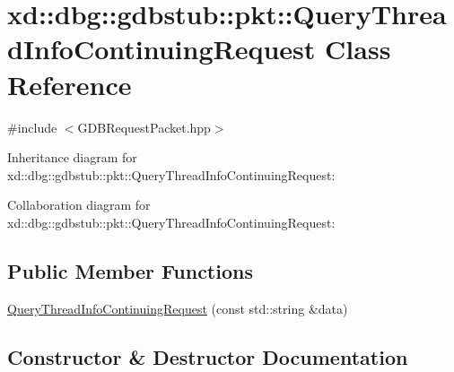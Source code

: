 \hypertarget{classxd_1_1dbg_1_1gdbstub_1_1pkt_1_1_query_thread_info_continuing_request}{}\section{xd\+:\+:dbg\+:\+:gdbstub\+:\+:pkt\+:\+:Query\+Thread\+Info\+Continuing\+Request Class Reference}
\label{classxd_1_1dbg_1_1gdbstub_1_1pkt_1_1_query_thread_info_continuing_request}


{\ttfamily \#include $<$G\+D\+B\+Request\+Packet.\+hpp$>$}



Inheritance diagram for xd\+:\+:dbg\+:\+:gdbstub\+:\+:pkt\+:\+:Query\+Thread\+Info\+Continuing\+Request\+:


Collaboration diagram for xd\+:\+:dbg\+:\+:gdbstub\+:\+:pkt\+:\+:Query\+Thread\+Info\+Continuing\+Request\+:
\subsection*{Public Member Functions}
\begin{DoxyCompactItemize}
\item 
\mbox{\hyperlink{classxd_1_1dbg_1_1gdbstub_1_1pkt_1_1_query_thread_info_continuing_request_a190a56c1f4686f480764b736d82f6138}{Query\+Thread\+Info\+Continuing\+Request}} (const std\+::string \&data)
\end{DoxyCompactItemize}


\subsection{Constructor \& Destructor Documentation}
\mbox{\label{classxd_1_1dbg_1_1gdbstub_1_1pkt_1_1_query_thread_info_continuing_request_a190a56c1f4686f480764b736d82f6138}} 
